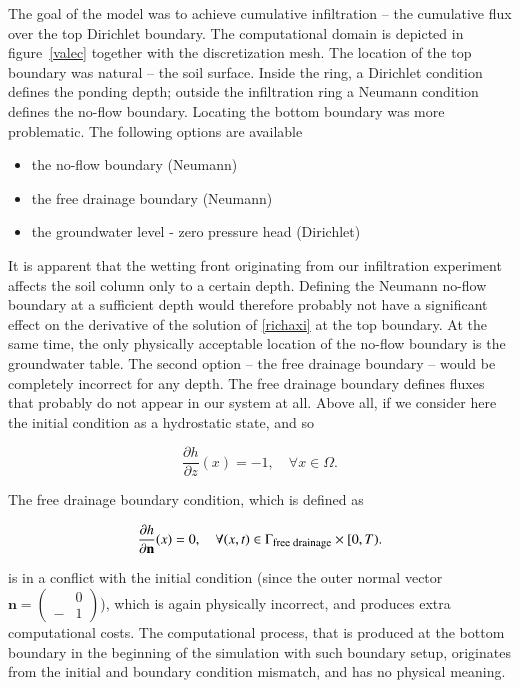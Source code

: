 \documentclass[review,times,3p,twocolumn,10pt]{elsarticle}
\newenvironment{lineq}
    {\begin{linenomath*}
    \begin{equation}
    }
    { 
    \end{equation} 
    \end{linenomath*}
    }
\renewcommand{\vec}{\mathbf}
\begin{document}
The goal of the model was to achieve cumulative infiltration -- the cumulative flux over the top Dirichlet boundary.
The computational domain is depicted in figure~\ref{valec} together with the discretization mesh. The location of the top boundary was natural -- the soil surface. Inside the ring, a Dirichlet condition defines the ponding depth; outside the infiltration ring a Neumann condition defines the no-flow boundary. Locating the bottom boundary was more problematic. The following options are available
\begin{itemize}
\item the no-flow boundary (Neumann)
\item the free drainage boundary (Neumann)
\item the groundwater level - zero pressure head (Dirichlet)
\end{itemize}
It is apparent that the wetting front originating from our infiltration experiment affects the soil column only to a certain depth. Defining the Neumann no-flow boundary at a sufficient depth would therefore probably not have a significant effect on the derivative of the solution of \eqref{richaxi} at the top boundary. At the same time, the only physically acceptable location of the no-flow boundary is the groundwater table. The second option -- the free drainage boundary -- would be completely incorrect for any depth. The free drainage boundary defines fluxes that probably do not appear in our system at all. Above all, if we consider here the initial condition  as a hydrostatic state, and so \begin{lineq} \frac{\partial h}{\partial z}(x) = -1, \quad \forall x \in \Omega .\end{lineq} The free drainage boundary condition, which is defined as
\begin{lineq}
\frac{\partial h}{\partial \vec{n}}(x) = 0, \quad \forall (x,t) \in \Gamma_{\mbox{\footnotesize free drainage}} \times [0,T).
\end{lineq}
is in a conflict with the initial condition (since the outer normal vector $\vec{n} = \left(\begin{smallmatrix} &0 \\ -&1 \end{smallmatrix} \right)$), which is again physically incorrect, and produces extra computational costs.  The computational process, that is produced at the bottom boundary in the beginning of the simulation with such boundary setup, originates from the initial and boundary condition mismatch, and has no physical meaning.
\end{document}
